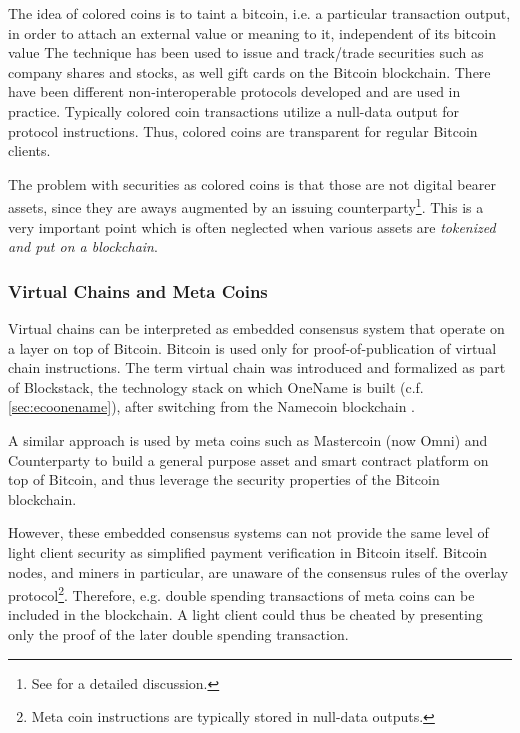 The idea of colored coins is to taint a bitcoin, i.e. a particular transaction output, in order to attach an external value or meaning to it, independent of its bitcoin value \parencite{coloredcoins} The technique has been used to issue and track/trade securities such as company shares and stocks, as well gift cards on the Bitcoin blockchain. There have been different non-interoperable protocols developed and are used in practice. Typically colored coin transactions utilize a null-data output for protocol instructions. Thus, colored coins are transparent for regular Bitcoin clients.

The problem with securities as colored coins is that those are not digital bearer assets, since they are aways augmented by an issuing counterparty\footnote{See \parencite{swanson2015} for a detailed discussion.}. This is a very important point which is often neglected when various assets are \emph{tokenized and put on a blockchain}.

\subsubsection{Virtual Chains and Meta Coins}

Virtual chains can be interpreted as embedded consensus system that operate on a layer on top of Bitcoin. Bitcoin is used only for proof-of-publication of virtual chain instructions. The term virtual chain was introduced and formalized as part of Blockstack, the technology stack on which OneName is built (c.f. \ref{sec:ecoonename}), after switching from the Namecoin blockchain \parencite{ali2016blockstack}. 

A similar approach is used by meta coins such as Mastercoin (now Omni) and Counterparty to build a general purpose asset and smart contract platform on top of Bitcoin, and thus leverage the security properties of the Bitcoin blockchain. 

However, these embedded consensus systems can not provide the same level of light client security as simplified payment verification in Bitcoin itself. Bitcoin nodes, and miners in particular, are unaware of the consensus rules of the overlay protocol\footnote{Meta coin instructions are typically stored in null-data outputs.}. Therefore, e.g. double spending transactions of meta coins can be included in the blockchain. A light client could thus be cheated by presenting only the proof of the later double spending transaction.


